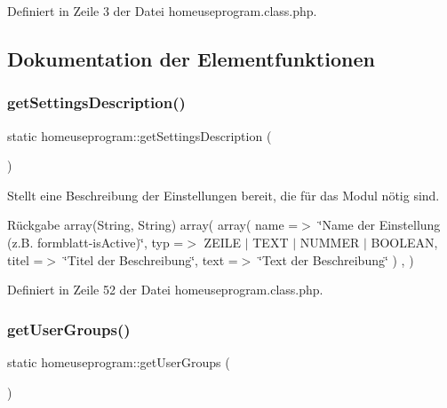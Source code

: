 Definiert in Zeile 3 der Datei homeuseprogram.\+class.\+php.



\subsection{Dokumentation der Elementfunktionen}
\mbox{\label{classhomeuseprogram_a1bb352f8474e0281f02662b7c83a52d7}} 
\subsubsection{\texorpdfstring{get\+Settings\+Description()}{getSettingsDescription()}}
{\footnotesize\ttfamily static homeuseprogram\+::get\+Settings\+Description (\begin{DoxyParamCaption}{ }\end{DoxyParamCaption})\hspace{0.3cm}{\ttfamily [static]}}

Stellt eine Beschreibung der Einstellungen bereit, die für das Modul nötig sind. \begin{DoxyReturn}{Rückgabe}
array(\+String, String) array( array( \textquotesingle{}name\textquotesingle{} =$>$ \char`\"{}\+Name der Einstellung (z.\+B. formblatt-\/is\+Active)\char`\"{}, \textquotesingle{}typ\textquotesingle{} =$>$ Z\+E\+I\+LE $\vert$ T\+E\+XT $\vert$ N\+U\+M\+M\+ER $\vert$ B\+O\+O\+L\+E\+AN, \textquotesingle{}titel\textquotesingle{} =$>$ \char`\"{}\+Titel der Beschreibung\char`\"{}, \textquotesingle{}text\textquotesingle{} =$>$ \char`\"{}\+Text der Beschreibung\char`\"{} ) , ) 
\end{DoxyReturn}


Definiert in Zeile 52 der Datei homeuseprogram.\+class.\+php.

\mbox{\label{classhomeuseprogram_a1fcda408408207c103bf98519260d2c2}} 
\subsubsection{\texorpdfstring{get\+User\+Groups()}{getUserGroups()}}
{\footnotesize\ttfamily static homeuseprogram\+::get\+User\+Groups (\begin{DoxyParamCaption}{ }\end{DoxyParamCaption})\hspace{0.3cm}{\ttfamily [static]}}

